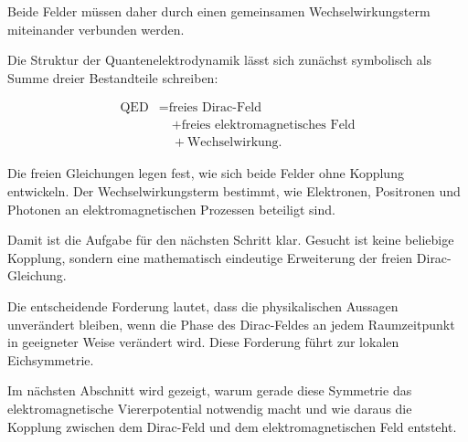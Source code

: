 Beide Felder müssen daher durch einen gemeinsamen Wechselwirkungsterm
miteinander verbunden werden.

\begin{PhysicsBox}
	\label{box:von_freien_feldern_zur_qed}

	Die Struktur der Quantenelektrodynamik lässt sich zunächst symbolisch
	als Summe dreier Bestandteile schreiben:

	\begin{equation*}
		\begin{aligned}
			\text{QED}
			&=
			\text{freies Dirac-Feld}
			\\
			&\quad+
			\text{freies elektromagnetisches Feld}
			\\
			&\quad+
			\text{Wechselwirkung}.
		\end{aligned}
	\end{equation*}

	Die freien Gleichungen legen fest, wie sich beide Felder ohne Kopplung
	entwickeln. Der Wechselwirkungsterm bestimmt, wie Elektronen,
	Positronen und Photonen an elektromagnetischen Prozessen beteiligt
	sind.
\end{PhysicsBox}

Damit ist die Aufgabe für den nächsten Schritt klar.
Gesucht ist keine beliebige Kopplung, sondern eine mathematisch
eindeutige Erweiterung der freien Dirac-Gleichung.

Die entscheidende Forderung lautet, dass die physikalischen Aussagen
unverändert bleiben, wenn die Phase des Dirac-Feldes an jedem
Raumzeitpunkt in geeigneter Weise verändert wird.
Diese Forderung führt zur lokalen
Eichsymmetrie.

Im nächsten Abschnitt wird gezeigt, warum gerade diese Symmetrie das
elektromagnetische Viererpotential notwendig macht und wie daraus die
Kopplung zwischen dem Dirac-Feld und dem elektromagnetischen Feld
entsteht.
